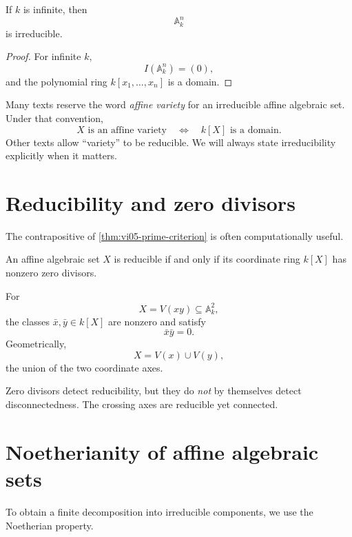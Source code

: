\begin{corollary}
\label{cor:vi05-affine-space-irreducible}
If \(k\) is infinite, then
\[
\mathbb A_k^n
\]
is irreducible.
\end{corollary}

\begin{proof}
For infinite \(k\),
\[
I(\mathbb A_k^n)=(0),
\]
and the polynomial ring \(k[x_1,\dots,x_n]\) is a domain.
\end{proof}

\begin{remark}
Many texts reserve the word \emph{affine variety} for an irreducible affine algebraic set.
Under that convention,
\[
X\text{ is an affine variety}
\quad\Longleftrightarrow\quad
k[X]\text{ is a domain}.
\]
Other texts allow ``variety'' to be reducible.  We will always state irreducibility
explicitly when it matters.
\end{remark}

\section{Reducibility and zero divisors}

The contrapositive of \cref{thm:vi05-prime-criterion} is often computationally useful.

\begin{corollary}
\label{cor:vi05-reducible-zero-divisors}
An affine algebraic set \(X\) is reducible if and only if its coordinate ring \(k[X]\)
has nonzero zero divisors.
\end{corollary}

\begin{example}
For
\[
X=V(xy)\subseteq\mathbb A_k^2,
\]
the classes \(\bar x,\bar y\in k[X]\) are nonzero and satisfy
\[
\bar x\bar y=0.
\]
Geometrically,
\[
X=V(x)\cup V(y),
\]
the union of the two coordinate axes.
\end{example}

Zero divisors detect reducibility, but they do \emph{not} by themselves detect
disconnectedness.  The crossing axes are reducible yet connected.



\section{Noetherianity of affine algebraic sets}

To obtain a finite decomposition into irreducible components, we use the Noetherian property.

